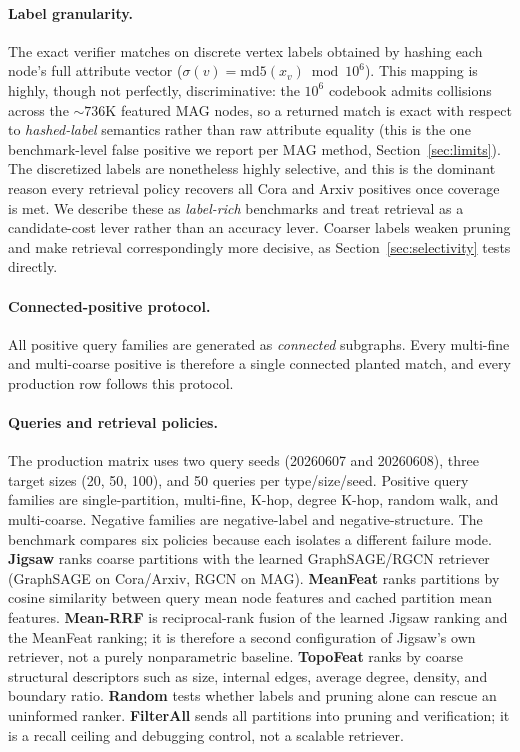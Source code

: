 \documentclass[runningheads]{llncs}
\begin{document}
\paragraph{Label granularity.} The exact verifier matches on discrete vertex labels obtained by hashing each node's full attribute vector ($\sigma(v)=\mathrm{md5}(x_v)\bmod 10^{6}$). This mapping is highly, though not perfectly, discriminative: the $10^{6}$ codebook admits collisions across the ${\sim}736$K featured MAG nodes, so a returned match is exact with respect to \emph{hashed-label} semantics rather than raw attribute equality (this is the one benchmark-level false positive we report per MAG method, Section~\ref{sec:limits}). The discretized labels are nonetheless highly selective, and this is the dominant reason every retrieval policy recovers all Cora and Arxiv positives once coverage is met. We describe these as \emph{label-rich} benchmarks and treat retrieval as a candidate-cost lever rather than an accuracy lever. Coarser labels weaken pruning and make retrieval correspondingly more decisive, as Section~\ref{sec:selectivity} tests directly.

\paragraph{Connected-positive protocol.}
All positive query families are generated as \emph{connected} subgraphs. Every multi-fine and multi-coarse positive is therefore a single connected planted match, and every production row follows this protocol.

\paragraph{Queries and retrieval policies.}
The production matrix uses two query seeds (20260607 and 20260608), three target sizes (20, 50, 100), and 50 queries per type/size/seed. Positive query families are single-partition, multi-fine, K-hop, degree K-hop, random walk, and multi-coarse. Negative families are negative-label and negative-structure. The benchmark compares six policies because each isolates a different failure mode. \textbf{Jigsaw} ranks coarse partitions with the learned GraphSAGE/RGCN retriever (GraphSAGE on Cora/Arxiv, RGCN on MAG). \textbf{MeanFeat} ranks partitions by cosine similarity between query mean node features and cached partition mean features. \textbf{Mean-RRF} is reciprocal-rank fusion of the learned Jigsaw ranking and the MeanFeat ranking; it is therefore a second configuration of Jigsaw's own retriever, not a purely nonparametric baseline. \textbf{TopoFeat} ranks by coarse structural descriptors such as size, internal edges, average degree, density, and boundary ratio. \textbf{Random} tests whether labels and pruning alone can rescue an uninformed ranker. \textbf{FilterAll} sends all partitions into pruning and verification; it is a recall ceiling and debugging control, not a scalable retriever.
\end{document}
